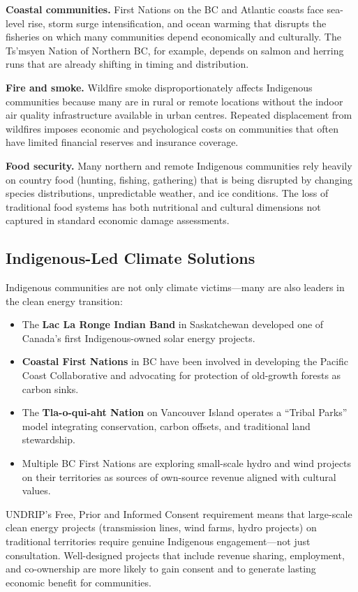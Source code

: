 \textbf{Coastal communities.} First Nations on the BC and Atlantic coasts face sea-level rise, storm surge intensification, and ocean warming that disrupts the fisheries on which many communities depend economically and culturally. The Ts'msyen Nation of Northern BC, for example, depends on salmon and herring runs that are already shifting in timing and distribution.

\textbf{Fire and smoke.} Wildfire smoke disproportionately affects Indigenous communities because many are in rural or remote locations without the indoor air quality infrastructure available in urban centres. Repeated displacement from wildfires imposes economic and psychological costs on communities that often have limited financial reserves and insurance coverage.

\textbf{Food security.} Many northern and remote Indigenous communities rely heavily on country food (hunting, fishing, gathering) that is being disrupted by changing species distributions, unpredictable weather, and ice conditions. The loss of traditional food systems has both nutritional and cultural dimensions not captured in standard economic damage assessments.

\subsection{Indigenous-Led Climate Solutions}

Indigenous communities are not only climate victims---many are also leaders in the clean energy transition:

\begin{itemize}
  \item The \textbf{Lac La Ronge Indian Band} in Saskatchewan developed one of Canada's first Indigenous-owned solar energy projects.
  \item \textbf{Coastal First Nations} in BC have been involved in developing the Pacific Coast Collaborative and advocating for protection of old-growth forests as carbon sinks.
  \item The \textbf{Tla-o-qui-aht Nation} on Vancouver Island operates a ``Tribal Parks'' model integrating conservation, carbon offsets, and traditional land stewardship.
  \item Multiple BC First Nations are exploring small-scale hydro and wind projects on their territories as sources of own-source revenue aligned with cultural values.
\end{itemize}

UNDRIP's Free, Prior and Informed Consent requirement means that large-scale clean energy projects (transmission lines, wind farms, hydro projects) on traditional territories require genuine Indigenous engagement---not just consultation. Well-designed projects that include revenue sharing, employment, and co-ownership are more likely to gain consent and to generate lasting economic benefit for communities.

